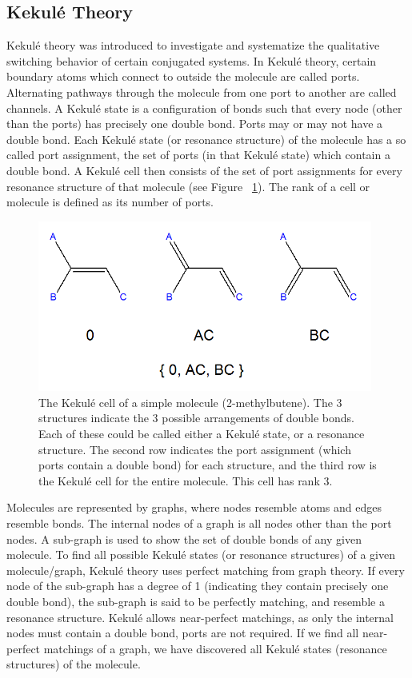 \documentclass[12pt]{article}
\begin{document}
\subsection{Kekul\'e Theory}

Kekul\'e theory \cite{H13, HH13} was introduced to investigate and systematize the qualitative switching behavior of certain conjugated systems. In Kekul\'e theory, certain boundary atoms which connect to outside the molecule are called ports.  Alternating pathways through the molecule from one port to another are called channels. A Kekul\'e state is a configuration of bonds such that every node (other than the ports) has precisely one double bond. Ports may or may not have a double bond. Each Kekul\'e state (or resonance structure) of the molecule has a so called port assignment, the set of ports (in that Kekul\'e state) which contain a double bond. A Kekul\'e cell then consists of the set of port assignments for every resonance structure of that molecule (see Figure ~\ref{fig:kekuleCell}). The rank of a cell or molecule is defined as its number of ports.

\begin{figure}[ht!]
\centering
\includegraphics[width=110mm]{KekuleCell.png}
\caption{The Kekul\'e cell of a simple molecule (2-methylbutene). The 3 structures indicate the 3 possible arrangements of double bonds. Each of these could be called either a Kekul\'e state, or a resonance structure. The second row indicates the port assignment (which ports contain a double bond) for each structure, and the third row is the Kekul\'e cell for the entire molecule. This cell has rank 3.}
\label{fig:kekuleCell}
\end{figure}

Molecules are represented by graphs, where nodes resemble atoms and edges resemble bonds. The internal nodes of a graph is all nodes other than the port nodes. A sub-graph is used to show the set of double bonds of any given molecule. To find all possible Kekul\'e states (or resonance structures) of a given molecule/graph, Kekul\'e theory uses perfect matching from graph theory. If every node of the sub-graph has a degree of 1 (indicating they contain precisely one double bond), the sub-graph is said to be perfectly matching, and resemble a resonance structure. Kekul\'e allows near-perfect matchings, as only the internal nodes must contain a double bond, ports are not required. If we find all near-perfect matchings of a graph, we have discovered all Kekul\'e states (resonance structures) of the molecule. 
\end{document}
